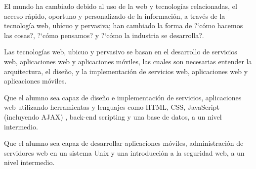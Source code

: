 \begin{syllabus}


\begin{justification}
El mundo ha cambiado debido al uso de la web y tecnologías relacionadas, el acceso rápido, oportuno y personalizado de la 
información, a través de la tecnología web, ubícuo  y pervasiva; han cambiado la forma de ?`cómo hacemos las cosas?, ?`cómo pensamos? y ?`cómo la industria se desarrolla?.

Las tecnologías web, ubicuo  y pervasivo se basan en el desarrollo de servicios web, aplicaciones web y aplicaciones móviles, 
las cuales son necesarias entender la arquitectura, el diseño, y la implementación de servicios web, aplicaciones web y aplicaciones móviles.
\end{justification}

\begin{goals}
    \item Que el alumno sea capaz de diseño e implementación de servicios, aplicaciones web utilizando herramientas y lenguajes como HTML, CSS, 
    JavaScript (incluyendo AJAX) , back-end scripting y una base de datos, a un nivel intermedio.
    \item Que el alumno sea capaz de desarrollar aplicaciones móviles, administración de servidores web en un sistema Unix y una introducción a la seguridad web, a un nivel intermedio.
\end{goals}


\begin{outcomes}
    \item {}
    \item {}
    \item {}
    \item {}
    \item {}
\end{outcomes}

\begin{competences}
    \item {}
    \item {}
    \item {}
\end{competences}



\end{syllabus}
